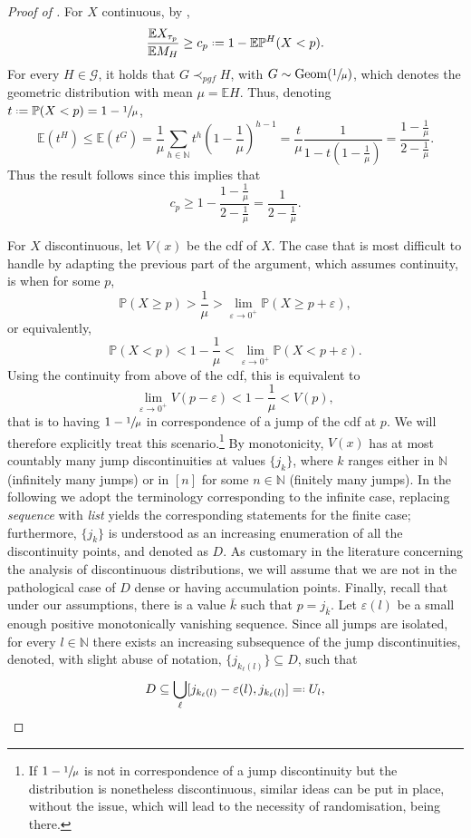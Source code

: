 \documentclass[11pt, a4paper, twoside]{article}
\newcommand*{\defeq}{\mathrel{\vcenter{\baselineskip0.5ex \lineskiplimit0pt
			\hbox{\scriptsize.}\hbox{\scriptsize.}}}=}
\newcommand*{\eqdef}{=\mathrel{\vcenter{\baselineskip0.5ex\lineskiplimit0pt
			\hbox{\scriptsize.}\hbox{\scriptsize.} }}}
\newcommand{\eps}{\varepsilon}
\newcommand{\NN}{\mathbb{N}}
\newcommand{\EE}{\mathbb{E}}
\newcommand{\PP}{\mathbb{P}}
\newcommand{\PGF}{\mathcal{G}}
\DeclareMathOperator{\Geom}{Geom}
\numberwithin{equation}{section}
\begin{document}
	\begin{proof}[Proof of ]
		For $X$ continuous, by ,
		\[\frac{\EE X_{\tau_p}}{\EE M_H}\ge c_p\defeq1-\EE\PP^H(X<p).\]
		For every $H\in\PGF$, it holds that $G\prec_{pgf}H$, with $G\sim\Geom(\sfrac{1}{\mu})$, which denotes the geometric distribution with mean $\mu=\EE H$. Thus, denoting $t\defeq \PP(X<p)=1-\sfrac{1}{\mu}$, 
		\[\EE \left(t^H\right)\le \EE\left( t^G\right)=\frac{1}{\mu}\sum_{h\in\NN}t^h\left(1-\frac{1}{\mu}\right)^{h-1}=\frac{t}{\mu}\frac{1}{1-t\left(1-\frac{1}{\mu}\right)}=\frac{1-\frac{1}{\mu}}{2-\frac{1}{\mu}}.\]
		Thus the result follows since this implies that 
		\[c_p\ge 1-\frac{1-\frac{1}{\mu}}{2-\frac{1}{\mu}}=\frac{1}{2-\frac{1}{\mu}}.\]
		
		For $X$ discontinuous, let $V(x)$ be the cdf of $X$. The case that is most difficult to handle by adapting the previous part of the argument, which assumes continuity, is when for some $p$, \[\PP(X\ge p)>\frac{1}{\mu}>\lim_{\eps\longrightarrow 0^+}\PP(X\ge p+\eps),\] or equivalently, \[\PP(X<p)<1-\frac{1}{\mu}<\lim_{\eps\longrightarrow0^+}\PP(X<p+\eps).\] Using the continuity from above of the cdf, this is equivalent to \[\lim_{\eps\longrightarrow0^+}V(p-\eps)<1-\frac{1}{\mu}<V(p),\] that is to having $1-\sfrac{1}{\mu}$ in correspondence of a jump of the cdf at $p$. We will therefore explicitly treat this scenario.\footnote{If $1-\sfrac{1}{\mu}$ is not in correspondence of a jump discontinuity but the distribution is nonetheless discontinuous, similar ideas can be put in place, without the issue, which will lead to the necessity of randomisation, being there.} By monotonicity, $V(x)$ has at most countably many jump discontinuities at values $\{j_k\}$, where $k$ ranges either in $\NN$ (infinitely many jumps) or in $[n]$ for some $n\in\NN$ (finitely many jumps). In the following we adopt the terminology corresponding to the infinite case, replacing \textit{sequence} with \textit{list} yields the corresponding statements for the finite case; furthermore, $\{j_k\}$ is understood as an increasing enumeration of all the discontinuity points, and denoted as $D$. As customary in the literature concerning the analysis of discontinuous distributions, we will assume that we are not in the pathological case of $D$ dense or having accumulation points. Finally, recall that under our assumptions, there is a value $\bar{k}$ such that $p=j_{\bar{k}}$. Let $\eps(l)$ be a small enough positive monotonically vanishing sequence. Since all jumps are isolated, for every $l\in\NN$ there exists an increasing subsequence of the jump discontinuities, denoted, with slight abuse of notation, $\{j_{k_{\ell}(l)}\}\subseteq D$, such that \[D\subseteq\bigcup_{\ell}[j_{k_{\ell}(l)}-\eps(l),j_{k_{\ell}(l)}]\eqdef U_l,\]

\end{proof}
\end{document}
